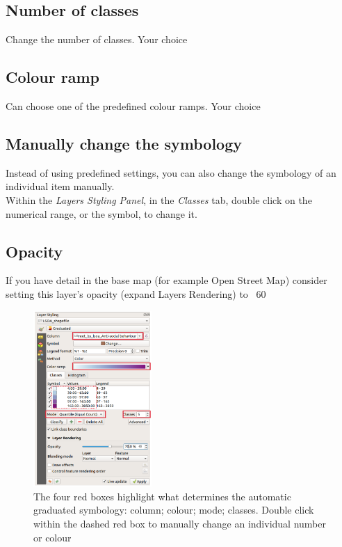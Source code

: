 
\subsection{Number of classes}
	
Change the number of classes. Your choice 

\subsection{Colour ramp}
	
Can choose one of the predefined colour ramps. Your choice 
	
\subsection{Manually change the symbology}
Instead of using predefined settings, you can also change the symbology of an individual item manually.\\
Within the \textit{Layers Styling Panel}, in the \textit{Classes} tab, double click on the numerical range, or the symbol, to change it.

\subsection{Opacity}
If you have detail in the base map (for example Open Street Map) consider setting this layer's opacity (expand Layers Rendering) to ~60%
\null\newpage
\begin{figure}[!h]
	\centering
	\includegraphics[width=0.4\textwidth]{images/graduated_symbology_options.png}
	\caption{The four red boxes highlight what determines the automatic graduated symbology: column; colour; mode; classes. Double click within the dashed red box to manually change an individual number or colour}
	\label{ft_fig_firstfig3}
\end{figure}
%
%

